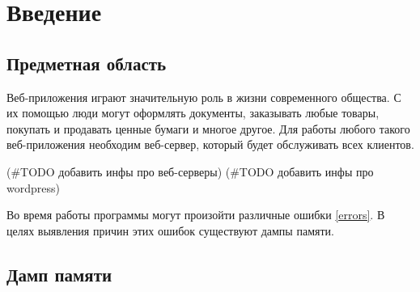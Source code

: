 \documentclass[20pt]{article}
\begin{document}
\newpage

\tableofcontents

\newpage

\section{Введение}

\subsection{Предметная область}
Веб-приложения играют значительную роль в жизни современного общества. С их
помощью люди могут оформлять документы, заказывать любые товары, покупать и
продавать ценные бумаги и многое другое. Для работы любого такого веб-приложения
необходим веб-сервер, который будет обслуживать всех клиентов.

(#TODO добавить инфы про веб-серверы)
(#TODO добавить инфы про wordpress)

Во время работы программы могут произойти различные ошибки\cite{error-types} \ref{errors}.
В целях выявления причин этих ошибок существуют дампы памяти.

\subsection{Дамп памяти}
\end{document}

